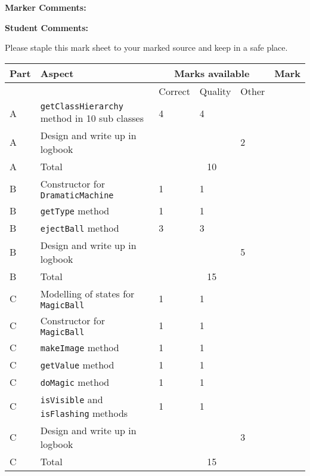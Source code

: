 \newcommand{\partAMarks}{10}
\newcommand{\partBMarks}{15}
\newcommand{\partCMarks}{15}
\newcommand{\partDMarks}{15}
\newcommand{\partEMarks}{5}
\newcommand{\MaximumMarks}{60}

\Large
\vspace{0.5in}
\textbf{Marker Comments:}
\vspace{1.5in}

\textbf{Student Comments:}
\vspace{1.5in}

\normalsize
Please staple this mark sheet to your marked source and keep
in a safe place.

\newpage

\begin{longtable}{|l|l|l|l|l|l|}
\hline
Part & Aspect & \multicolumn{3}{|c|}{Marks available} & Mark\\ \hline
     &        & Correct & Quality & Other & \\ \hline
\endhead
A    & \texttt{getClassHierarchy} method in 10 sub classes & 4 & 4 & & \\*
A    & Design and write up in logbook & & & 2 & \\*
\hline
A    & Total & \multicolumn{3}{|c|}{\partAMarks}  & \\*
\hline
\hline
B    & Constructor for \texttt{DramaticMachine} & 1 & 1 & & \\*
B    & \texttt{getType} method & 1 & 1 & & \\*
B    & \texttt{ejectBall} method & 3 & 3 && \\*
B    & Design and write up in logbook & & & 5 & \\*
\hline
B    & Total & \multicolumn{3}{|c|}{\partBMarks}  & \\*
\hline
\hline
C    & Modelling of states for \texttt{MagicBall} & 1 & 1 & & \\*
C    & Constructor for \texttt{MagicBall} & 1 & 1 & & \\*
C    & \texttt{makeImage} method & 1 & 1 & & \\*
C    & \texttt{getValue} method & 1 & 1 & & \\*
C    & \texttt{doMagic} method & 1 & 1 & & \\*
C    & \texttt{isVisible} and \texttt{isFlashing} methods & 1 & 1 & & \\*
C    & Design and write up in logbook & & & 3 & \\*
\hline
C    & Total & \multicolumn{3}{|c|}{\partCMarks}  & \\*
\hline
\hline

\end{longtable}
